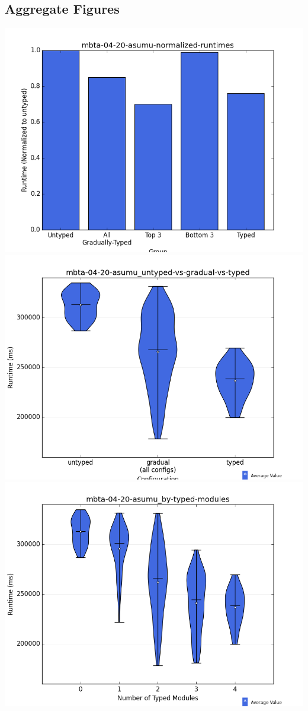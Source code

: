 \documentclass{article}
\begin{document}
\subsection{Aggregate Figures}
\includegraphics[width=\textwidth]{mbta-04-20-asumu-normalized-runtimes-bar.png}
\includegraphics[width=\textwidth]{mbta-04-20-asumu_untyped-vs-gradual-vs-typed-violin.png}
\includegraphics[width=\textwidth]{mbta-04-20-asumu_by-typed-modules-violin.png}
\end{document}
